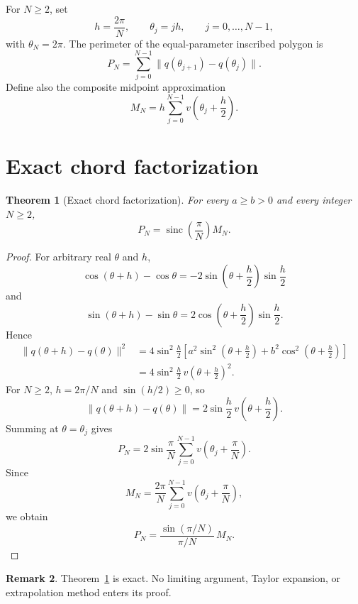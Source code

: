 \documentclass[11pt]{article}
\newtheorem{theorem}{Theorem}[section]
\theoremstyle{definition}
\newtheorem{remark}[theorem]{Remark}
\newcommand{\sinc}{\operatorname{sinc}}
\numberwithin{equation}{section}
\begin{document}
For \(N\ge2\), set
\[
h=\frac{2\pi}{N},
\qquad
\theta_j=jh,
\qquad
j=0,\dots,N-1,
\]
with \(\theta_N=2\pi\).  The perimeter of the equal-parameter inscribed
polygon is
\begin{equation}
\label{eq:PN}
P_N
=
\sum_{j=0}^{N-1}
\|q(\theta_{j+1})-q(\theta_j)\|.
\end{equation}
Define also the composite midpoint approximation
\begin{equation}
\label{eq:MN}
M_N
=
h\sum_{j=0}^{N-1}
v\!\left(\theta_j+\frac h2\right).
\end{equation}

\section{Exact chord factorization}

\begin{theorem}[Exact chord factorization]
\label{thm:factorization}
For every \(a\ge b>0\) and every integer \(N\ge2\),
\begin{equation}
\label{eq:factorization}
\boxed{
P_N=
\sinc\!\left(\frac{\pi}{N}\right)M_N.
}
\end{equation}
\end{theorem}

\begin{proof}
For arbitrary real \(\theta\) and \(h\),
\[
\cos(\theta+h)-\cos\theta
=
-2\sin\!\left(\theta+\frac h2\right)\sin\frac h2
\]
and
\[
\sin(\theta+h)-\sin\theta
=
2\cos\!\left(\theta+\frac h2\right)\sin\frac h2.
\]
Hence
\begin{align*}
\|q(\theta+h)-q(\theta)\|^2
&=
4\sin^2\frac h2
\left[
a^2\sin^2\!\left(\theta+\frac h2\right)
+
b^2\cos^2\!\left(\theta+\frac h2\right)
\right] \\
&=
4\sin^2\frac h2\,
v\!\left(\theta+\frac h2\right)^2.
\end{align*}
For \(N\ge2\), \(h=2\pi/N\) and \(\sin(h/2)\ge0\), so
\[
\|q(\theta+h)-q(\theta)\|
=
2\sin\frac h2\,
v\!\left(\theta+\frac h2\right).
\]
Summing at \(\theta=\theta_j\) gives
\[
P_N
=
2\sin\frac{\pi}{N}
\sum_{j=0}^{N-1}
v\!\left(\theta_j+\frac{\pi}{N}\right).
\]
Since
\[
M_N
=
\frac{2\pi}{N}
\sum_{j=0}^{N-1}
v\!\left(\theta_j+\frac{\pi}{N}\right),
\]
we obtain
\[
P_N
=
\frac{\sin(\pi/N)}{\pi/N}\,M_N.
\]
\end{proof}

\begin{remark}
Theorem~\ref{thm:factorization} is exact.  No limiting argument,
Taylor expansion, or extrapolation method enters its proof.
\end{remark}
\end{document}
